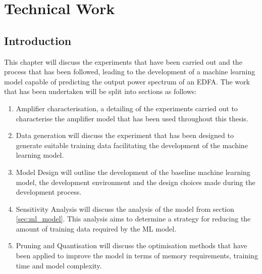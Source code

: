 \chapter{Technical Work}
\label{ch:tw}



\section{Introduction} 
\label{tw:intro}

This chapter will discuss the experiments that have been carried out and the process that has been followed, leading to the development of a machine learning model capable of predicting the output power spectrum of an EDFA. 
The work that has been undertaken will be split into sections as follows:
\begin{enumerate}
    \item Amplifier characterisation, a detailing of the experiments carried out to characterise the amplifier model that has been used throughout this thesis.
    
    \item Data generation will discuss the experiment that has been designed to generate suitable training data facilitating the development of the machine learning model.
    
    \item Model Design will outline the development of the baseline machine learning model, the development environment and the design choices made during the development process.
    
    \item Sensitivity Analysis will discuss the analysis of the model from section \ref{sec:ml_model}. This analysis aims to determine a strategy for reducing the amount of training data required by the ML model.
    
    \item Pruning and Quantisation will discuss the optimisation methods that have been applied to improve the model in terms of memory requirements, training time and model complexity. 
\end{enumerate}




